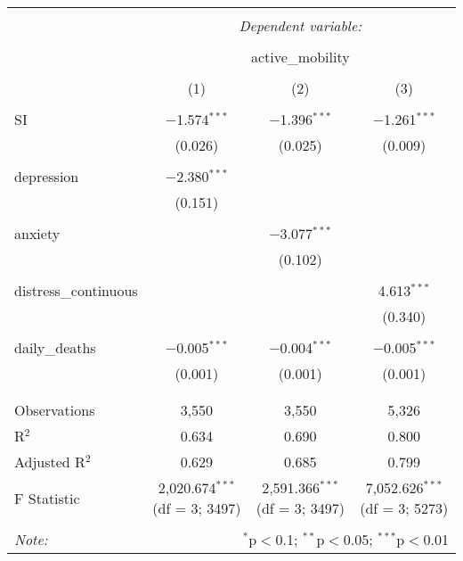 
\begin{table}[!htbp] \centering 
  \caption{} 
  \label{} 
\begin{tabular}{@{\extracolsep{5pt}}lccc} 
\\[-1.8ex]\hline 
\hline \\[-1.8ex] 
 & \multicolumn{3}{c}{\textit{Dependent variable:}} \\ 
\cline{2-4} 
\\[-1.8ex] & \multicolumn{3}{c}{active\_mobility} \\ 
\\[-1.8ex] & (1) & (2) & (3)\\ 
\hline \\[-1.8ex] 
 SI & $-$1.574$^{***}$ & $-$1.396$^{***}$ & $-$1.261$^{***}$ \\ 
  & (0.026) & (0.025) & (0.009) \\ 
  & & & \\ 
 depression & $-$2.380$^{***}$ &  &  \\ 
  & (0.151) &  &  \\ 
  & & & \\ 
 anxiety &  & $-$3.077$^{***}$ &  \\ 
  &  & (0.102) &  \\ 
  & & & \\ 
 distress\_continuous &  &  & 4.613$^{***}$ \\ 
  &  &  & (0.340) \\ 
  & & & \\ 
 daily\_deaths & $-$0.005$^{***}$ & $-$0.004$^{***}$ & $-$0.005$^{***}$ \\ 
  & (0.001) & (0.001) & (0.001) \\ 
  & & & \\ 
\hline \\[-1.8ex] 
Observations & 3,550 & 3,550 & 5,326 \\ 
R$^{2}$ & 0.634 & 0.690 & 0.800 \\ 
Adjusted R$^{2}$ & 0.629 & 0.685 & 0.799 \\ 
F Statistic & 2,020.674$^{***}$ (df = 3; 3497) & 2,591.366$^{***}$ (df = 3; 3497) & 7,052.626$^{***}$ (df = 3; 5273) \\ 
\hline 
\hline \\[-1.8ex] 
\textit{Note:}  & \multicolumn{3}{r}{$^{*}$p$<$0.1; $^{**}$p$<$0.05; $^{***}$p$<$0.01} \\ 
\end{tabular} 
\end{table} 
